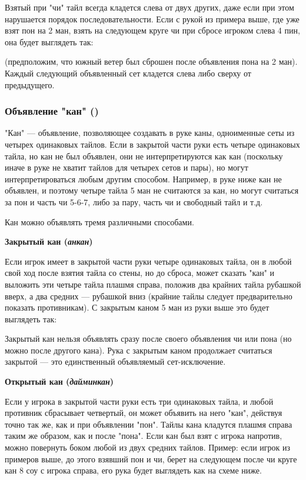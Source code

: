 Взятый при "чи" тайл всегда кладется слева от двух других, даже если при этом нарушается порядок последовательности. Если с рукой из примера выше, где уже взят пон на 2 ман, взять на следующем круге чи при сбросе игроком слева 4 пин, она будет выглядеть так:

 \hfill {}

(предположим, что южный ветер был сброшен после объявления пона на 2 ман). Каждый следующий объявленный сет кладется слева либо сверху от предыдущего.

\subsubsection{Объявление "кан" ()}

"Кан" --- объявление, позволяющее создавать в руке каны, одноименные сеты из четырех одинаковых тайлов. Если в закрытой части руки есть четыре одинаковых тайла, но кан не был объявлен, они не интерпретируются как кан (поскольку иначе в руке не хватит тайлов для четырех сетов и пары), но могут интерпретироваться любым другим способом. Например, в руке ниже кан не объявлен, и поэтому четыре тайла 5 ман не считаются за кан, но могут считаться за пон и часть чи 5-6-7, либо за пару, часть чи и свободный тайл и т.д.


Кан можно объявлять тремя различными способами.

\textbf{Закрытый кан (\textit{анкан})}

Если игрок имеет в закрытой части руки четыре одинаковых тайла, он в любой свой ход после взятия тайла со стены, но до сброса, может сказать "кан" и выложить эти четыре тайла плашмя справа, положив два крайних тайла рубашкой вверх, а два средних --- рубашкой вниз (крайние тайлы следует предварительно показать противникам). С закрытым каном 5 ман из руки выше это будет выглядеть так:

 \hfill {}

Закрытый кан нельзя объявлять сразу после своего объявления чи или пона (но можно после другого кана). Рука с закрытым каном продолжает считаться закрытой --- это единственный объявляемый сет-исключение.

\textbf{Открытый кан (\textit{дайминкан})}

Если у игрока в закрытой части руки есть три одинаковых тайла, и любой противник сбрасывает четвертый, он может объявить на него "кан", действуя точно так же, как и при объявлении "пон". Тайлы кана кладутся плашмя справа таким же образом, как и после "пона". Если кан был взят с игрока напротив, можно повернуть боком любой из двух средних тайлов. Пример: если игрок из примеров выше, до этого взявший пон и чи, берет на следующем после чи круге кан 8 соу с игрока справа, его рука будет выглядеть как на схеме ниже.

